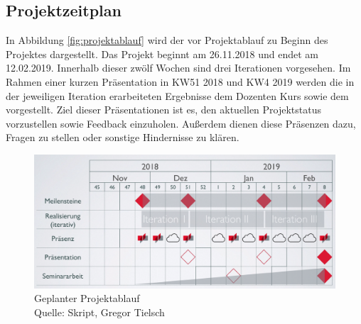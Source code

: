	\subsection{Projektzeitplan}
	In Abbildung \vref{fig:projektablauf} wird der vor Projektablauf zu Beginn des Projektes dargestellt. Das Projekt beginnt am 26.11.2018 und endet am 12.02.2019. Innerhalb dieser zwölf Wochen sind drei Iterationen vorgesehen. Im Rahmen einer kurzen Präsentation in KW51 2018 und KW4 2019 werden die in der jeweiligen Iteration erarbeiteten Ergebnisse dem Dozenten Kurs sowie dem vorgestellt. Ziel dieser Präsentationen ist es, den aktuellen Projektstatus vorzustellen sowie Feedback einzuholen. Außerdem dienen diese Präsenzen dazu, Fragen zu stellen oder sonstige Hindernisse zu klären. 
	\begin{figure}[H]
		\centering 
		\includegraphics[scale=0.3]{img/geplanterProjektablauf.png}
		\captionsetup{format=hang}
		\caption[Geplanter Projektablauf ]{\label{fig:projektablauf} Geplanter Projektablauf \\ Quelle: Skript, Gregor Tielsch }
	\end{figure}
	
